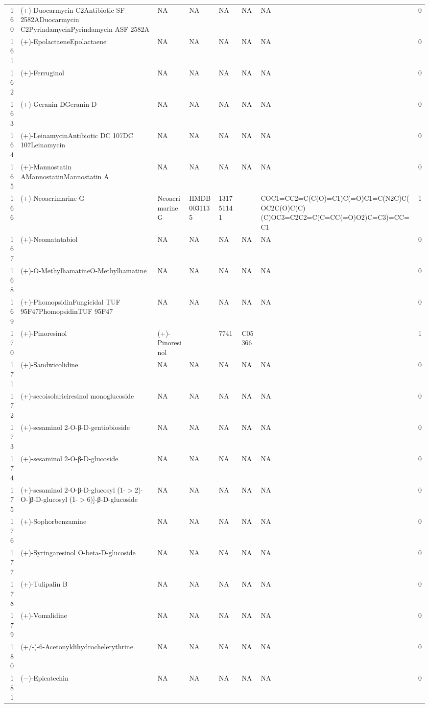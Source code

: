 \documentclass[a4paper]{article}
\begin{document}
\begin{longtable}{rlllllll}
  160 & (+)-Duocarmycin C2Antibiotic SF 2582ADuocarmycin C2PyrindamycinPyrindamycin ASF 2582A & NA & NA & NA & NA & NA & 0 \\ 
  161 & (+)-EpolactaeneEpolactaene & NA & NA & NA & NA & NA & 0 \\ 
  162 & (+)-Ferruginol & NA & NA & NA & NA & NA & 0 \\ 
  163 & (+)-Geranin DGeranin D & NA & NA & NA & NA & NA & 0 \\ 
  164 & (+)-LeinamycinAntibiotic DC 107DC 107Leinamycin & NA & NA & NA & NA & NA & 0 \\ 
  165 & (+)-Mannostatin AMannostatinMannostatin A & NA & NA & NA & NA & NA & 0 \\ 
  166 & (+)-Neoacrimarine-G & Neoacrimarine G & HMDB0031135 & 131751141 &  & COC1=CC2=C(C(O)=C1)C(=O)C1=C(N2C)C(OC2C(O)C(C)(C)OC3=C2C2=C(C=CC(=O)O2)C=C3)=CC=C1 & 1 \\ 
  167 & (+)-Neomatatabiol & NA & NA & NA & NA & NA & 0 \\ 
  168 & (+)-O-MethylhamatineO-Methylhamatine & NA & NA & NA & NA & NA & 0 \\ 
  169 & (+)-PhomopsidinFungicidal TUF 95F47PhomopsidinTUF 95F47 & NA & NA & NA & NA & NA & 0 \\ 
  170 & (+)-Pinoresinol & (+)-Pinoresinol &  & 7741 & C05366 &  & 1 \\ 
  171 & (+)-Sandwicolidine & NA & NA & NA & NA & NA & 0 \\ 
  172 & (+)-secoisolariciresinol monoglucoside & NA & NA & NA & NA & NA & 0 \\ 
  173 & (+)-sesaminol 2-O-β-D-gentiobioside & NA & NA & NA & NA & NA & 0 \\ 
  174 & (+)-sesaminol 2-O-β-D-glucoside & NA & NA & NA & NA & NA & 0 \\ 
  175 & (+)-sesaminol 2-O-β-D-glucosyl (1-$>$2)-O-[β-D-glucosyl (1-$>$6)]-β-D-glucoside & NA & NA & NA & NA & NA & 0 \\ 
  176 & (+)-Sophorbenzamine & NA & NA & NA & NA & NA & 0 \\ 
  177 & (+)-Syringaresinol O-beta-D-glucoside & NA & NA & NA & NA & NA & 0 \\ 
  178 & (+)-Tulipalin B & NA & NA & NA & NA & NA & 0 \\ 
  179 & (+)-Vomalidine & NA & NA & NA & NA & NA & 0 \\ 
  180 & (+/-)-6-Acetonyldihydrochelerythrine & NA & NA & NA & NA & NA & 0 \\ 
  181 & (−)-Epicatechin & NA & NA & NA & NA & NA & 0 \\ 

\end{longtable}
\end{document}
